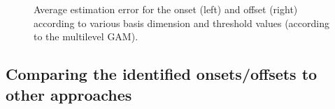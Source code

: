 \documentclass[
  doc,
  floatsintext,
  longtable,
  a4paper,
  nolmodern,
  notxfonts,
  notimes,
  colorlinks=true,linkcolor=blue,citecolor=blue,urlcolor=blue]{apa7}
\begin{document}
\begin{figure}[!htb]

\caption{\label{fig-onset-error}Average estimation error for the onset
(left) and offset (right) according to various basis dimension and
threshold values (according to the multilevel GAM).}


\end{figure}%

\newpage

\subsection{Comparing the identified onsets/offsets to other
approaches}\label{comparing-the-identified-onsetsoffsets-to-other-approaches}
\end{document}
